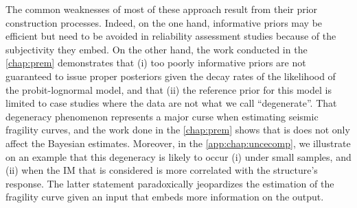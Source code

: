 The common 
weaknesses of most of these approach result from  %
their prior construction processes.  
Indeed, on the one hand, informative priors may be efficient but need to be 
avoided in reliability assessment studies because of the subjectivity they embed.
On the other hand, the work conducted in the \cref{chap:prem} demonstrates that (i) too poorly informative priors are not guaranteed to issue proper posteriors given the decay rates of the likelihood of the probit-lognormal model, and that (ii)  the reference prior for this model is limited to 
case studies where the data are not what we call ``degenerate''. %
That degeneracy phenomenon represents a major curse when estimating seismic fragility curves, and the work done in the \cref{chap:prem} shows that is does not only affect the Bayesian estimates.
Moreover, in the \cref{app:chap:uncecomp}, we illustrate on an example that this degeneracy is likely to occur (i) under small samples, and (ii) when the IM that is considered is more correlated with the structure's response.
The latter statement paradoxically jeopardizes the estimation of the fragility curve given an input that embeds more information on the output. %














